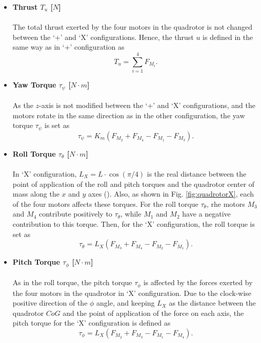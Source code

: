 \begin{itemize}
\item \textbf{Thrust $T_u$ [$N$]}\\\\
The total thrust exerted by the four motors in the quadrotor is not changed between the `+' and `X' configurations. Hence, the thrust $u$ is defined in the same way as in `+' configuration as
\begin{equation}
\label{ec:ux}
T_u = \sum_{i=1}^{4}F_{M_i}.
\end{equation}

\item \textbf{Yaw Torque $\tau_{\psi}$ [$N\cdot m$]}\\\\
As the $z$-axis is not modified between the `+' and `X' configurations, and the motors rotate in the same direction as in the other configuration, the yaw torque $\tau_\psi$ is set as
\begin{equation}
\label{ec:taupsix}
\tau_{\psi} = K_{m}(F_{M_2} + F_{M_4} - F_{M_1} - F_{M_3}).
\end{equation}

\item \textbf{Roll Torque $\tau_{\theta}$ [$N\cdot m$]}\\\\
In `X' configuration, $L_{X} = L\cdot \cos\left(\pi/4\right)$ is the real distance between the point of application of the roll and pitch torques and the quadrotor center of mass along the $x$ and $y$ axes (\cite{Faessler2016}). Also, as shown in Fig. \ref{fig:quadrotorX}, each of the four motors affects these torques. For the roll torque $\tau_{\theta}$, rhe motors $M_3$ and $M_4$ contribute positively to $\tau_\theta$, while $M_1$ and $M_2$ have a negative contribution to this torque. Then, for the `X' configuration, the roll torque is set as
\begin{equation}
\label{ec:tauthetax}
\tau_{\theta} = L_{X}(F_{M_3}+F_{M_4}-F_{M_2}-F_{M_1}).
\end{equation}

\item \textbf{Pitch Torque $\tau_{\phi}$ [$N\cdot m$]}\\\\
As in the roll torque, the pitch torque $\tau_{\phi}$ is affected by the forces exerted by the four motors in the quadrotor in `X' configuration. Due to the clock-wise positive direction of the $\phi$ angle, and keeping $L_X$ as the distance between the quadrotor $CoG$ and the point of application of the force on each axis, the pitch torque for the `X' configuration is defined as
\begin{equation}
\label{ec:tauphix}
\tau_{\phi} = L_{X}(F_{M_2}+F_{M_3}-F_{M_1}-F_{M_4}).
\end{equation}

\end{itemize}






